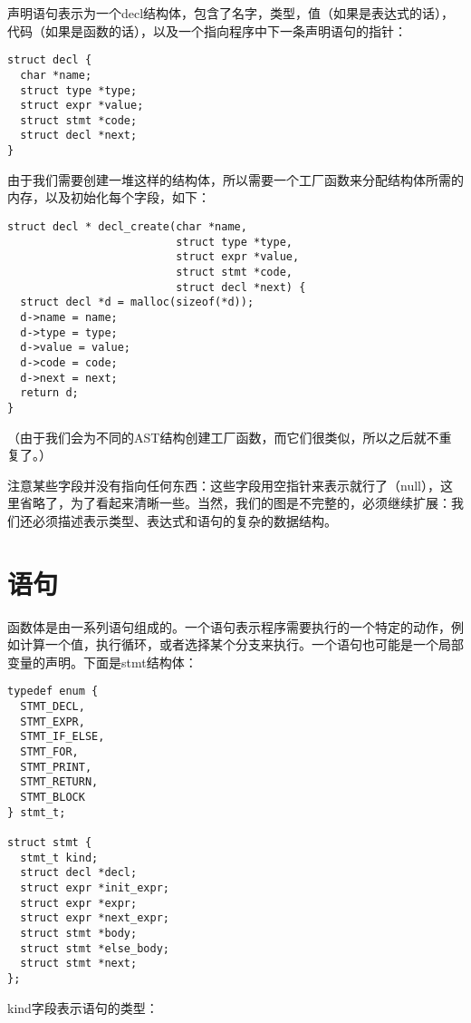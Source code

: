 \documentclass[cn,11pt,chinese]{elegantbook}
\begin{document}
声明语句表示为一个decl结构体，包含了名字，类型，值（如果是表达式的话），代码（如果是函数的话），以及一个指向程序中下一条声明语句的指针：

\begin{verbatim}
struct decl {
  char *name;
  struct type *type;
  struct expr *value;
  struct stmt *code;
  struct decl *next;
}
\end{verbatim}

由于我们需要创建一堆这样的结构体，所以需要一个工厂函数来分配结构体所需的内存，以及初始化每个字段，如下：

\begin{verbatim}
struct decl * decl_create(char *name,
                          struct type *type,
                          struct expr *value,
                          struct stmt *code,
                          struct decl *next) {
  struct decl *d = malloc(sizeof(*d));
  d->name = name;
  d->type = type;
  d->value = value;
  d->code = code;
  d->next = next;
  return d;
}
\end{verbatim}

（由于我们会为不同的AST结构创建工厂函数，而它们很类似，所以之后就不重复了。）

注意某些字段并没有指向任何东西：这些字段用空指针来表示就行了（null），这里省略了，为了看起来清晰一些。当然，我们的图是不完整的，必须继续扩展：我们还必须描述表示类型、表达式和语句的复杂的数据结构。

\section{语句}

函数体是由一系列语句组成的。一个语句表示程序需要执行的一个特定的动作，例如计算一个值，执行循环，或者选择某个分支来执行。一个语句也可能是一个局部变量的声明。下面是stmt结构体：

\begin{verbatim}
typedef enum {
  STMT_DECL,
  STMT_EXPR,
  STMT_IF_ELSE,
  STMT_FOR,
  STMT_PRINT,
  STMT_RETURN,
  STMT_BLOCK
} stmt_t;

struct stmt {
  stmt_t kind;
  struct decl *decl;
  struct expr *init_expr;
  struct expr *expr;
  struct expr *next_expr;
  struct stmt *body;
  struct stmt *else_body;
  struct stmt *next;
};
\end{verbatim}

kind字段表示语句的类型：
\end{document}
